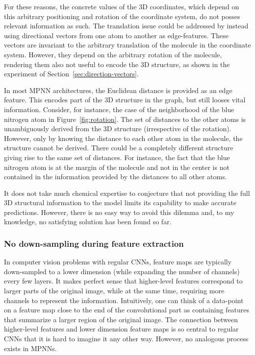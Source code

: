 For these reasons, the concrete values of the 3D coordinates, which depend on this arbitrary positioning and rotation of the coordinate system, do not posses relevant information as such. The translation issue could be addressed by instead using directional vectors from one atom to another as edge-features. These vectors are invariant to the arbitrary translation of the molecule in the coordinate system. However, they depend on the arbitrary rotation of the molecule, rendering them also not useful to encode the 3D structure, as shown in the experiment of Section~\ref{sec:direction-vectors}.

In most MPNN architectures, the Euclidean distance is provided as an edge feature. This encodes part of the 3D structure in the graph, but still looses vital information. Consider, for instance, the case of the neighborhood of the blue nitrogen atom in Figure~\ref{fig:rotation}. The set of distances to the other atoms is unambiguously derived from the 3D structure (irrespective of the rotation). However, only by knowing the distance to each other atom in the molecule, the structure cannot be derived. There could be a completely different structure giving rise to the same set of distances. For instance, the fact that the blue nitrogen atom is at the margin of the molecule and not in the center is not contained in the information provided by the distances to all other atoms.


It does not take much chemical expertise to conjecture that not providing the full 3D structural information to the model limits its capability to make accurate predictions. However, there is no easy way to avoid this dilemma and, to my knowledge, no satisfying solution has been found so far.

\subsubsection{No down-sampling during feature extraction}

In computer vision problems with regular CNNs, feature maps are typically down-sampled to a lower dimension (while expanding the number of channels) every few layers. It makes perfect sense that higher-level features correspond to larger parts of the original image, while at the same time, requiring more channels to represent the information. Intuitively, one can think of a data-point on a feature map close to the end of the convolutional part as containing features that summarize a larger region of the original image. The connection between higher-level features and lower dimension feature maps is so central to regular CNNs that it is hard to imagine it any other way. However, no analogous process exists in MPNNs.

